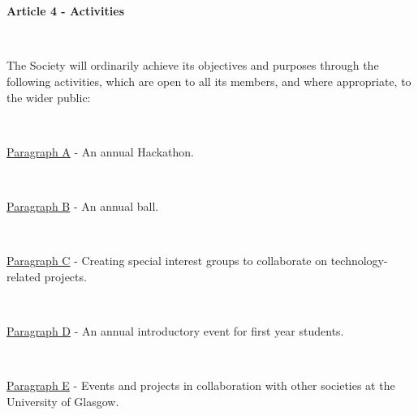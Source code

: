 ~

~

\large{\textbf{Article 4 - Activities}}

~

The Society will ordinarily achieve its objectives and purposes through the
following activities, which are open to all its members,
and where appropriate, to the wider public:

~

\underline{Paragraph A} - An annual Hackathon.

~

\underline{Paragraph B} - An annual ball.

~

\underline{Paragraph C} - Creating special interest groups to
collaborate on technology-related projects.

~

\underline{Paragraph D} - An annual introductory event for first year
students.

~

\underline{Paragraph E} - Events and projects in collaboration with
other societies at the University of Glasgow.
